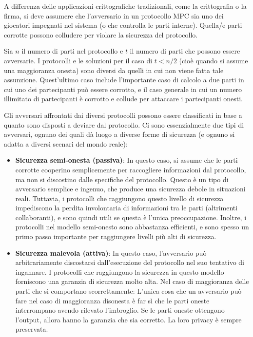 \documentclass[
  italian,
]{book}
\providecommand{\tightlist}{%
  \setlength{\itemsep}{0pt}\setlength{\parskip}{0pt}}
\begin{document}
A differenza delle applicazioni crittografiche tradizionali, come la crittografia o la firma, si deve assumere che l'avversario in un protocollo MPC sia uno dei giocatori impegnati nel sistema (o che controlla le parti interne). Quella/e parti corrotte possono colludere per violare la sicurezza del protocollo.

Sia \(n\) il numero di parti nel protocollo e \(t\) il numero di parti che possono essere avversarie. I protocolli e le soluzioni per il caso di \(t<n/2\) (cioè quando si assume una maggioranza onesta) sono diversi da quelli in cui non viene fatta tale assunzione. Quest'ultimo caso include l'importante caso di calcolo a due parti in cui uno dei partecipanti può essere corrotto, e il caso generale in cui un numero illimitato di partecipanti è corrotto e collude per attaccare i partecipanti onesti.

Gli avversari affrontati dai diversi protocolli possono essere classificati in base a quanto sono disposti a deviare dal protocollo. Ci sono essenzialmente due tipi di avversari, ognuno dei quali dà luogo a diverse forme di sicurezza (e ognuno si adatta a diversi scenari del mondo reale):

\begin{itemize}
\tightlist
\item
  \textbf{Sicurezza semi-onesta (passiva)}: In questo caso, si assume che le parti corrotte cooperino semplicemente per raccogliere informazioni dal protocollo, ma non si discostino dalle specifiche del protocollo. Questo è un tipo di avversario semplice e ingenuo, che produce una sicurezza debole in situazioni reali. Tuttavia, i protocolli che raggiungono questo livello di sicurezza impediscono la perdita involontaria di informazioni tra le parti (altrimenti collaboranti), e sono quindi utili se questa è l'unica preoccupazione. Inoltre, i protocolli nel modello semi-onesto sono abbastanza efficienti, e sono spesso un primo passo importante per raggiungere livelli più alti di sicurezza.
\item
  \textbf{Sicurezza malevola (attiva)}: In questo caso, l'avversario può arbitrariamente discostarsi dall'esecuzione del protocollo nel suo tentativo di ingannare. I protocolli che raggiungono la sicurezza in questo modello forniscono una garanzia di sicurezza molto alta. Nel caso di maggioranza delle parti che si comportano scorrettamente: L'unica cosa che un avversario può fare nel caso di maggioranza disonesta è far sì che le parti oneste interrompano avendo rilevato l'imbroglio. Se le parti oneste ottengono l'output, allora hanno la garanzia che sia corretto. La loro privacy è sempre preservata.
\end{itemize}
\end{document}
